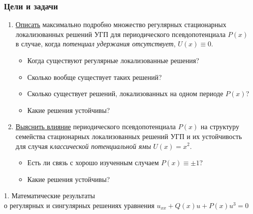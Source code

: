 \documentclass [10pt] {beamer}
\begin{document}
\begin{frame}
	\frametitle{Цели и задачи}
	
	\begin{enumerate}
		\setlength\itemsep{10pt}
		\item \underline{Описать} максимально подробно множество регулярных стационарных локализованных решений УГП для периодического псевдопотенциала $P(x)$ в случае, когда {\it потенциал удержания отсутствует}, $U(x) \equiv 0$.
			\begin{itemize}
				\item Когда существуют регулярные локализованные решения?
				\item Сколько вообще существует таких решений?
 				\item Сколько существует решений, локализованных на одном периоде $P(x)$?
				\item Какие решения устойчивы?
			\end{itemize}
			
		\item \underline{Выяснить влияние} периодического псевдопотенциала $P(x)$ на структуру семейства стационарных локализованных решений УГП и их устойчивость для случая {\it классической потенциальной ямы} $U(x) = x^2$.
			\begin{itemize}
				\item Есть ли связь с хорошо изученным случаем $P(x) \equiv \pm 1$?
				\item Какие решения устойчивы?
			\end{itemize}
	\end{enumerate}
\end{frame}

\begin{frame}
	\begin{center}
		\LARGE 1. Математические результаты \\ о регулярных и сингулярных решениях уравнения $u_{xx} + Q(x) u + P(x) u^3 = 0$
	\end{center}
\end{frame}
\end{document}
